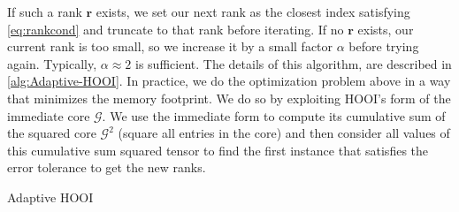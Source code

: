     If such a rank $\mathbf{r}$ exists, we set our next rank as the closest
    index satisfying \eqref{eq:rankcond} and truncate to that rank before
    iterating. If no $\mathbf{r}$ exists, our current rank is too small, so we
    increase it by a small factor $\alpha$ before trying again. Typically,
    $\alpha \approx 2$ is sufficient. The details of this algorithm, are
    described in \ref{alg:Adaptive-HOOI}. In practice, we do the optimization
    problem above in a way that minimizes the memory footprint. We do so by
    exploiting HOOI's form of the immediate core $\mathcal{G}$. We use the
    immediate form to compute its cumulative sum of the squared core
    $\mathcal{G}^2$ (square all entries in the core) and then consider all
    values of this cumulative sum squared tensor to find the first instance that
    satisfies the error tolerance to get the new ranks.

    \begin{algorithm}
        \caption{Adaptive HOOI}
        \label{alg:Adaptive-HOOI}
        \begin{algorithmic}
                    \State{}
                \Else{}
                \EndIf{}
            \EndFunction{}
        \end{algorithmic}
    \end{algorithm}

    
